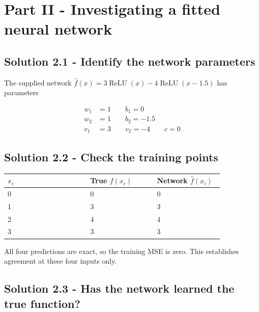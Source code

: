 \documentclass{course_sheet}
\begin{document}
\section{Part II - Investigating a fitted neural network}

\subsection{Solution 2.1 - Identify the network parameters}

The supplied network
$\hat f(x)=3\operatorname{ReLU}(x)-4\operatorname{ReLU}(x-1.5)$ has
parameters

\begin{equation*}
\begin{split}
w_1&=1\qquad b_1=0\\
w_2&=1\qquad b_2=-1.5\\
v_1&=3\qquad v_2=-4\qquad c=0
\end{split}
\end{equation*}

\subsection{Solution 2.2 - Check the training points}

\begin{center}

\begingroup
\setlength{\tabcolsep}{3pt}
\begin{tabular}{@{}p{0.362\linewidth}p{0.295\linewidth}p{0.295\linewidth}@{}}
\toprule
$x_i$ & True $f(x_i)$ & Network $\hat f(x_i)$ \\
\midrule
0 & 0 & 0 \\
1 & 3 & 3 \\
2 & 4 & 4 \\
3 & 3 & 3 \\
\bottomrule
\end{tabular}
\endgroup

\end{center}

All four predictions are exact, so the training MSE is zero. This
establishes agreement at these four inputs only.

\subsection{Solution 2.3 - Has the network learned the true function?}
\end{document}
